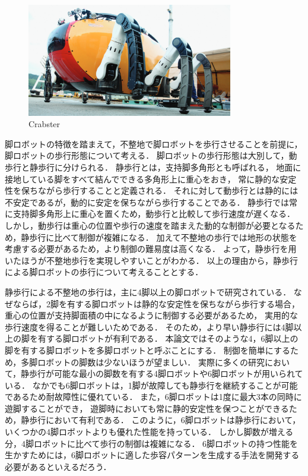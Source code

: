 \begin{figure}[t]
  \begin{center}
    \includegraphics[width=90mm, clip]{figure/chapter1/crabster.png}
    \caption{Crabster}
    \label{fig:ch1_crabster} %
  \end{center}
\end{figure}

脚ロボットの特徴を踏まえて，不整地で脚ロボットを歩行させることを前提に，脚ロボットの歩行形態について考える．
脚ロボットの歩行形態は大別して，動歩行と静歩行に分けられる．
静歩行とは，支持脚多角形とも呼ばれる，
地面に接地している脚をすべて結んでできる多角形上に重心をおき，
常に静的な安定性を保ちながら歩行することと定義される\cite{Hirose_Static_stability_criterion}．
それに対して動歩行とは静的には不安定であるが，動的に安定を保ちながら歩行することである．
静歩行では常に支持脚多角形上に重心を置くため，動歩行と比較して歩行速度が遅くなる．
しかし，動歩行は重心の位置や歩行の速度を踏まえた動的な制御が必要となるため，静歩行に比べて制御が複雑になる．
加えて不整地の歩行では地形の状態を考慮する必要があるため，より制御の難易度は高くなる．
よって，静歩行を用いたほうが不整地歩行を実現しやすいことがわかる．
以上の理由から，静歩行による脚ロボットの歩行について考えることとする．

静歩行による不整地の歩行は，主に4脚以上の脚ロボットで研究されている．
なぜならば，2脚を有する脚ロボットは静的な安定性を保ちながら歩行する場合，
重心の位置が支持脚面積の中になるように制御する必要があるため，
実用的な歩行速度を得ることが難しいためである．
そのため，より早い静歩行には4脚以上の脚を有する脚ロボットが有利である．
本論文ではそのような4，6脚以上の脚を有する脚ロボットを多脚ロボットと呼ぶことにする．
制御を簡単にするため，多脚ロボットの脚数は少ないほうが望ましい．
実際に多くの研究において，静歩行が可能な最小の脚数を有する4脚ロボットや6脚ロボットが用いられている．
なかでも6脚ロボットは，1脚が故障しても静歩行を継続することが可能であるため耐故障性に優れている．
また，6脚ロボットは1度に最大3本の同時に遊脚することができ，
遊脚時においても常に静的安定性を保つことができるため，静歩行において有利である．
このように，6脚ロボットは静歩行において，いくつかの4脚ロボットよりも優れた性能を持っている．
しかし脚数が増える分，4脚ロボットに比べて歩行の制御は複雑になる．
6脚ロボットの持つ性能を生かすためには，6脚ロボットに適した歩容パターンを生成する手法を開発する必要があるといえるだろう．

